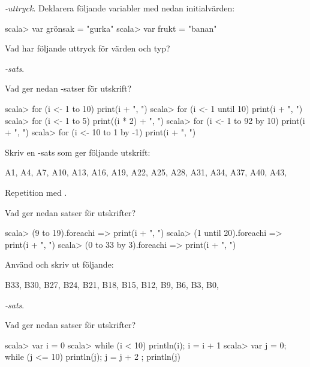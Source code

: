 {{{{\Task {}\textit{-uttryck}. Deklarera följande variabler med nedan initialvärden:

\begin{REPL}
scala> var grönsak = "gurka"
scala> var frukt = "banan"
\end{REPL}

Vad har följande uttryck för värden och typ?

\Subtask {}

\Subtask {}

\Subtask {}

\Subtask {}

\Subtask {}


\Task {}\textit{-sats}.

\Subtask Vad ger nedan -satser för utskrift?

\begin{REPL}
scala> for (i <- 1 to 10) print(i + ", ")
scala> for (i <- 1 until 10) print(i + ", ")
scala> for (i <- 1 to 5) print((i * 2) + ", ")
scala> for (i <- 1 to 92 by 10) print(i + ", ")
scala> for (i <- 10 to 1 by -1) print(i + ", ")
\end{REPL}

\Subtask Skriv en -sats som ger följande utskrift:
\begin{REPL}
A1, A4, A7, A10, A13, A16, A19, A22, A25, A28, A31, A34, A37, A40, A43, 
\end{REPL}

\Task Repetition med .

\Subtask Vad ger nedan satser för utskrifter?

\begin{REPL}
scala> (9 to 19).foreach{i => print(i + ", ")}
scala> (1 until 20).foreach{i => print(i + ", ")}
scala> (0 to 33 by 3).foreach{i => print(i + ", ")}
\end{REPL}

\Subtask Använd  och skriv ut följande:
\begin{REPL}
B33, B30, B27, B24, B21, B18, B15, B12, B9, B6, B3, B0, 
\end{REPL}

\Task {}\textit{-sats}. 

\Subtask Vad ger nedan satser för utskrifter?
\begin{REPL}
scala> var i = 0
scala> while (i < 10) { println(i); i = i + 1 }
scala> var j = 0; while (j <= 10) { println(j); j = j + 2 }; println(j)
\end{REPL}

}}}}

